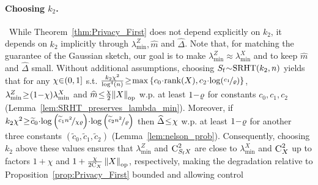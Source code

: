 \documentclass[11pt]{article}
\theoremstyle{definition}
\theoremstyle{plain}
\providecommand{\theoremref}[1]{Theorem~\ref{#1}}
\providecommand{\lemmaref}[1]{Lemma~\ref{#1}}
\providecommand{\propositionref}[1]{Proposition~\ref{#1}}
\newcommand{\Norm}[1]{\left\| #1 \right\|}
\providecommand{\norm}[1]{\Norm{#1}}
\begin{document}
\paragraph{Choosing $k_2$.} \ While \theoremref{thm:Privacy_First} does not depend explicitly on \(k_2\), it depends on \(k_2\) implicitly through $\lambda^{Z}_{\min}, \widehat{m}$ and $\widehat{\Delta}$. Note that, for matching the guarantee of the Gaussian sketch, our goal is to make $\lambda^{Z}_{\min} \approx \lambda^{X}_{\min}$ and to keep $\widehat{m}$ and $\widehat{\Delta}$ small. Without additional assumptions, choosing $S_{\mathrm{f}} \hspace{-0.25em}\sim\hspace{-0.25em} \mathrm{SRHT}(k_2, n)$ yields that for any \(\chi\hspace{-0.25em}\in\hspace{-0.25em}(0,1]\) s.t. $\frac{k_2\chi^2}{\log^4(n)} \hspace{-0.2em}\geq\hspace{-0.2em} \max\left\{c_0\hspace{-0.2em}\cdot\hspace{-0.2em} \mathrm{rank}(X), c_2\hspace{-0.2em}\cdot\hspace{-0.2em}\log(\nicefrac{c_1}{\varrho})\right\}$, $\lambda^{Z}_{\min} \hspace{-0.2em}\geq\hspace{-0.2em} (1\hspace{-0.2em}-\hspace{-0.2em}\chi) \lambda^{X}_{\min}$ and $\widehat{m} \hspace{-0.2em}\leq\hspace{-0.2em} \frac{\chi}{2} \hspace{-0.2em}\norm{X}_{\mathrm{op}}$ w.p. at least $1\hspace{-0.2em}-\hspace{-0.2em}\varrho$ for constants \(c_0,c_1, c_2\) (\lemmaref{lem:SRHT_preserves_lambda_min}). Moreover, if $k_2\chi^2 \hspace{-0.2em}\geq\hspace{-0.2em} \widetilde{c}_0\hspace{-0.2em}\cdot\hspace{-0.2em} \log\left(\nicefrac{\widetilde{c}_1n^2}{\chi\varrho}\right)\hspace{-0.2em}\cdot\hspace{-0.2em} \log\left(\nicefrac{\widetilde{c}_2n^2}{\varrho}\right)$ then $\widehat{\Delta} \hspace{-0.2em}\leq\hspace{-0.2em} \chi$ w.p. at least $1\hspace{-0.2em}-\hspace{-0.2em}\varrho$ for another three constants $(\widetilde{c}_0, \widetilde{c}_1, \widetilde{c}_2)$ (\lemmaref{lem:nelson_prob}). Consequently, choosing \(k_2\) above these values ensures that $\lambda^{Z}_{\min}$ and $\textsc{C}^2_{S_{\mathrm{f}}X}$ are close to $\lambda^{X}_{\min}$ and $\textsc{C}^2_{X}$ up to factors $1+\chi$ and $1 + \frac{\chi}{2\textsc{C}_X}\norm{X}_{\mathrm{op}}$, respectively, making the degradation relative to \propositionref{prop:Privacy_First} bounded and allowing control 
\end{document}
